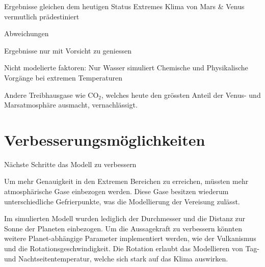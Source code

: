 \begin{refsection}
Ergebnisse gleichen dem heutigen Status
Extremes Klima von Mars \& Venus vermutlich prädestiniert

Abweichungen

Ergebnisse nur mit Vorsicht zu geniessen

Nicht modelierte faktoren:
Nur Wasser simuliert
Chemische und Physikalische Vorgänge bei extremen Temperaturen

Andere Treibhausgase wie CO$_2$, welches heute den grössten Anteil der Venus- und Marsatmosphäre ausmacht, vernachlässigt.

\section{Verbesserungsmöglichkeiten}

Nächste Schritte das Modell zu verbessern

Um mehr Genauigkeit in den Extremen Bereichen zu erreichen, müssten mehr atmosphärische Gase einbezogen werden.
Diese Gase besitzen wiederum unterschiedliche Gefrierpunkte, was die Modellierung der Vereisung zulässt.
		
Im simulierten Modell wurden lediglich der Durchmesser und die Distanz zur Sonne der Planeten einbezogen. Um die Aussagekraft zu verbessern könnten weitere Planet-abhängige Parameter implementiert werden, wie der Vulkanismus und die Rotationsgeschwindigkeit. Die Rotation erlaubt das Modellieren von Tag- und Nachtseitentemperatur, welche sich stark auf das Klima auswirken.


\printbibliography[heading=subbibliography]
\end{refsection}
